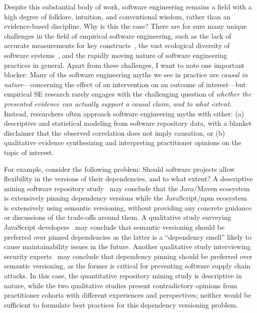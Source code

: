 Despite this substantial body of work, software engineering remains a field with a high degree of folklore, intuition, and conventional wisdom, rather than an evidence-based discipline.
Why is this the case?
There are for sure many unique challenges in the field of empirical software engineering, such as the lack of accurate measurements for key constructs~\cite{DBLP:conf/ease/RalphT18}, the vast ecological diversity of software systems~\cite{DBLP:conf/sigsoft/NagappanZB13}, and the rapidly moving nature of software engineering practices in general.
Apart from these challenges, I want to note one important blocker: Many of the software engineering myths we see in practice are \emph{causal in nature}---concerning the effect of an intervention on an outcome of interest---but empirical SE research rarely engages with the challenging question of \emph{whether the presented evidence can actually support a causal claim, and to what extent}.
Instead, researchers often approach software engineering myths with either: (a) descriptive and statistical modeling from software repository data, with a blanket disclaimer that the observed correlation does not imply causation, or (b) qualitative evidence synthesizing and interpreting practitioner opinions on the topic of interest.

For example, consider the following problem: Should software projects allow flexibility in the versions of their dependencies, and to what extent?
A descriptive mining software repository study~\cite{DBLP:conf/msr/0001PSTB19} may conclude that the Java/Maven ecosystem is extensively pinning dependency versions while the JavaScript/npm ecosystem is extensively using semantic versioning, without providing any concrete guidance or discussions of the trade-offs around them.
A qualitative study surveying JavaScript developers~\cite{DBLP:journals/tse/JafariCAST22} may conclude that semantic versioning should be preferred over pinned dependencies as the latter is a ``dependency smell'' likely to cause maintainability issues in the future.
Another qualitative study interviewing security experts~\cite{DBLP:conf/sp/LadisaPMB23} may conclude that dependency pinning should be preferred over semantic versioning, as the former is critical for preventing software supply chain attacks.
In this case, the quantitative repository mining study is descriptive in nature, while the two qualitative studies present contradictory opinions from practitioner cohorts with different experiences and perspectives; neither would be sufficient to formulate best practices for this dependency versioning problem.

